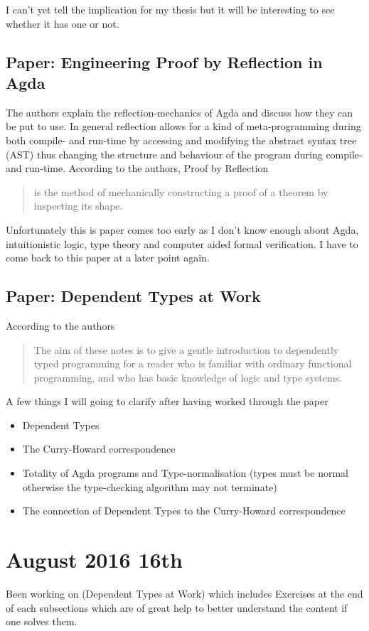 I can't yet tell the implication for my thesis but it will be interesting to see whether it has one or not.

\subsection*{Paper: Engineering Proof by Reflection in Agda \cite{vanderWalt2013}}
The authors explain the reflection-mechanics of Agda and discuss how they can be put to use.
In general reflection allows for a kind of meta-programming during both compile- and run-time by accessing and modifying the abstract syntax tree (AST) thus changing the structure and behaviour of the program during compile- and run-time. According to the authors, Proof by Reflection
\begin{quote}
is the method of mechanically constructing a proof of a theorem by inspecting its shape.
\end{quote}

Unfortunately this is paper comes too early as I don't know enough about Agda, intuitionistic logic, type theory and computer aided formal verification. I have to come back to this paper at a later point again.

\subsection*{Paper: Dependent Types at Work \cite{Bove2009}}
According to the authors

\begin{quote}
The aim of these notes is to give a gentle introduction to dependently typed programming for a reader who is familiar with ordinary functional programming, and who has basic knowledge of logic and type systems.
\end{quote}

A few things I will going to clarify after having worked through the paper

\begin{itemize}
\item Dependent Types
\item The Curry-Howard correspondence
\item Totality of Agda programs and Type-normalisation (types must be normal otherwise the type-checking algorithm may not terminate)
\item The connection of Dependent Types to the Curry-Howard correspondence
\end{itemize}

\section*{August 2016 16th}
Been working on \cite{Bove2009} (Dependent Types at Work) which includes Exercises at the end of each subsections which are of great help to better understand the content if one solves them.


